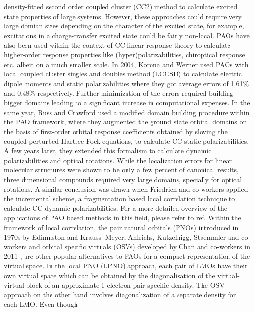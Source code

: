 density-fitted second order coupled cluster (CC2) \cite{} method to calculate excited state properties of 
large systems.\cite{} However, these approaches could require very large domian sizes depending on the 
character of the excited state, for example, excitations in a charge-transfer excited state could be 
fairly non-local. PAOs have also been used within the context of CC linear response theory to calculate 
higher-order response properties like (hyper)polarizabilities, chiroptical response etc. albeit on a 
much smaller scale.\cite{} In 2004, Korona and Werner\cite{} used PAOs with local coupled cluster singles 
and doubles method (LCCSD) to calculate electric dipole moments and static polarizabilities where they got 
average errors of 1.61\% and 0.48\% respectively. Further minimization of the errors required building bigger 
domains leading to a significant increase in computational expenses. In the same year, Russ and Crawford\cite{} 
used a modified domain building procedure within the PAO framework, where they augmented the ground state 
orbital domains on the basis of first-order orbital response coefficients obtained by sloving the coupled-perturbed 
Hartree-Fock equations, to calculate CC static polarizabilities. A few years later, they extended this 
formalism to calculate dynamic polarizabilities and optical rotations\cite{}. While the localization errors 
for linear molecular structures were shown to be only a few percent of canonical results, three dimensional 
compounds required very large domains, specially for optical rotations. A similar conclusion was drawn 
when Friedrich and co-workers applied the incremental scheme, a fragmentation based local correlation technique 
to calculate CC dynamic polarizabilities.\cite{} For a more detailed overview of the applications of PAO based 
methods in this field, please refer to ref\cite{McAlexander15}. Within the framework of local correlation, 
the pair natural orbitals (PNOs) introduced in 1970s by Edimnston and Krauss\cite{}, Meyer\cite{}, Ahlrichs\cite{}, 
Kutzelnigg\cite{}, Staemmler and co-workers\cite{} and orbital specific virtuals (OSVs) developed by Chan and 
co-workers in 2011 \cite{}, are other popular alternatives to PAOs for a compact representation of the virtual 
space. In the local PNO (LPNO) approach, each pair of LMOs have their own virtual space which can be obtained 
by the diagonalization of the virtual-virtual block of an approximate 1-electron pair specific density. 
The OSV approach on the other hand involves diagonalization of a separate density for each LMO. Even though 
